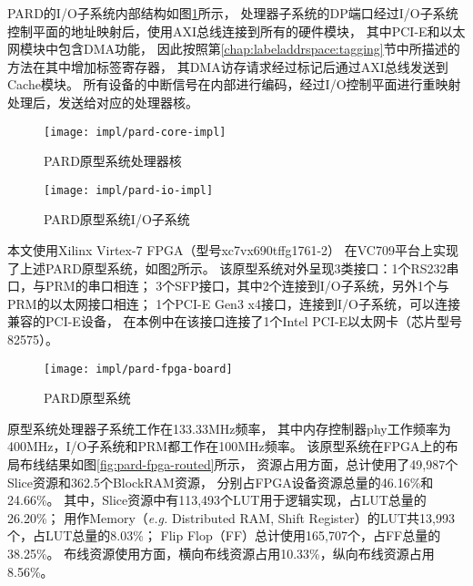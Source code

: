 PARD的I/O子系统内部结构如图\ref{fig:pard-io-impl}所示，
处理器子系统的DP端口经过I/O子系统控制平面的地址映射后，使用AXI总线连接到所有的硬件模块，
其中PCI-E和以太网模块中包含DMA功能，
因此按照第\ref{chap:labeladdrspace:tagging}节中所描述的方法在其中增加标签寄存器，
其DMA访存请求经过标记后通过AXI总线发送到Cache模块。
所有设备的中断信号在内部进行编码，经过I/O控制平面进行重映射处理后，发送给对应的处理器核。

\begin{figure}[tb]
\begin{minipage}{0.48\textwidth}
  \centering
  \texttt{[image: impl/pard-core-impl]}
  \caption{PARD原型系统处理器核}
  \label{fig:pard-core-impl}
\end{minipage}\hfill
\begin{minipage}{0.48\textwidth}
  \centering
  \texttt{[image: impl/pard-io-impl]}
  \caption{PARD原型系统I/O子系统}
  \label{fig:pard-io-impl}
\end{minipage}
\end{figure}

本文使用Xilinx Virtex-7 FPGA（型号xc7vx690tffg1761-2）
在VC709平台上实现了上述PARD原型系统，如图\ref{fig:pard-fpga-board}所示。
该原型系统对外呈现3类接口：1个RS232串口，与PRM的串口相连；
3个SFP接口，其中2个连接到I/O子系统，另外1个与PRM的以太网接口相连；
1个PCI-E Gen3 x4接口，连接到I/O子系统，可以连接兼容的PCI-E设备，
在本例中在该接口连接了1个Intel PCI-E以太网卡（芯片型号82575）。

\begin{figure}[tb]
  \centering
  \texttt{[image: impl/pard-fpga-board]}
  \caption{PARD原型系统}
  \label{fig:pard-fpga-board}
\end{figure}

原型系统处理器子系统工作在133.33MHz频率，
其中内存控制器phy工作频率为400MHz，I/O子系统和PRM都工作在100MHz频率。
该原型系统在FPGA上的布局布线结果如图\ref{fig:pard-fpga-routed}所示，
资源占用方面，总计使用了49,987个Slice资源和362.5个BlockRAM资源，
分别占FPGA设备资源总量的46.16\%和24.66\%。
其中，Slice资源中有113,493个LUT用于逻辑实现，占LUT总量的26.20\%；
用作Memory（\emph{e.g.} Distributed RAM, Shift Register）的LUT共13,993个，占LUT总量的8.03\%；
Flip Flop（FF）总计使用165,707个，占FF总量的38.25\%。
布线资源使用方面，横向布线资源占用10.33\%，纵向布线资源占用8.56\%。

